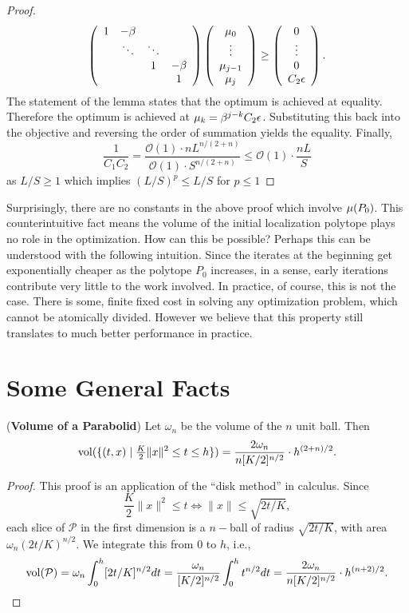 \begin{proof}
$$ 
\left(\begin{array}{cccc}
1 & -\beta\\
 & \ddots & \ddots\\
 &  & 1 & -\beta\\
 &  &  & 1
\end{array}\right)\left(\begin{array}{c}
\mu_{0}\\
\vdots\\
\mu_{j-1}\\
\mu_{j}
\end{array}\right)\geq\left(\begin{array}{c}
0\\
\vdots\\
0\\
C_2\epsilon
\end{array}\right).
$$
The statement of the lemma states that the optimum is achieved at equality. Therefore the optimum is achieved at $\mu_{k}=\beta^{j-k}C_2\epsilon$. Substituting this back into the objective and reversing the order of summation yields the equality. Finally,
\[
\frac{1}{C_1C_2}=
\frac{\mathcal{O}(1)\cdot n L^{n/(2+n)}}{\mathcal{O}(1)\cdot S^{n/(2+n)}} 
\leq\mathcal{O}(1)\cdot\frac{n L}{S}
\]
as $L/S \geq 1$ which implies $(L/S)^p
\leq L/S$ for $p\leq1$
\end{proof}
%

Surprisingly, there are no constants in the above proof which involve
$\mu(P_0)$. This counterintuitive fact means the volume of the initial
localization polytope plays no role in the optimization. How can this be
possible?  Perhaps this can be understood with the following intuition. Since
the iterates at the beginning get exponentially cheaper as the polytope $P_0$
increases, in a sense, early iterations contribute very little to the work
involved. In practice, of course, this is not the case. There is some, finite
fixed cost in solving any optimization problem, which cannot be atomically
divided. However we believe that this property still translates to much better
performance in practice.

\section{Some General Facts}
\begin{lem} \label{vol-paranolid}
({\bf Volume of a Parabolid}) Let $\omega_n$ be the volume of the $n$ unit ball. Then
\[
{\rm vol}(\{(t,x)\mid\tfrac{K}{2}\|x\|^2\leq t \leq h\})=
\frac{2\omega_n}{n[K/2]^{n/2}}\cdot h^{(2+n)/2}.
\]
\end{lem}
\begin{proof}
This proof is an application of the ``disk method'' in calculus.
Since
\[
\frac{K}{2}\|x\|^2\leq t\iff\|x\|\leq\sqrt{2t/K},
\]
each slice of $\mathcal{P}$ in the first dimension is a $n-$ball
of radius $\sqrt{2t/K}$, with area $\omega_n(2t/K)^{n/2}$. We integrate
this from $0$ to $h$,
i.e.,
\[
{\rm vol}(\mathcal{P})=
\omega_n\int_0^{h}[2t/K]{}^{n/2}dt=
\frac{\omega_n}{[K/2]^{n/2}}\int_0^{h}t^{n/2}dt=
\frac{2\omega_n}{n[K/2]^{n/2}}\cdot h^{(n+2)/2}.
\]
\end{proof}
%

